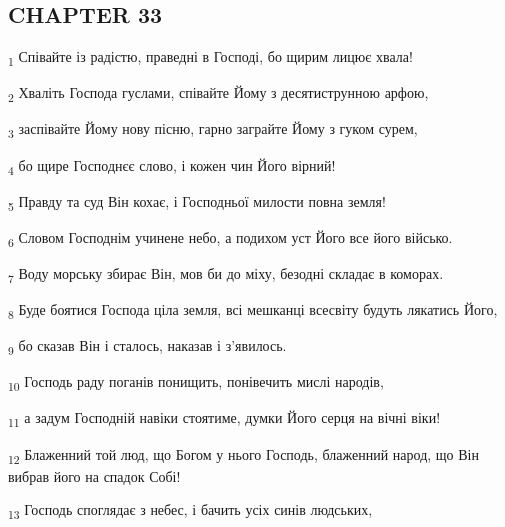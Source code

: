 \subsection{CHAPTER 33}
\begin{tcolorbox}
\textsubscript{1} Співайте із радістю, праведні в Господі, бо щирим лицює хвала!
\end{tcolorbox}
\begin{tcolorbox}
\textsubscript{2} Хваліть Господа гуслами, співайте Йому з десятиструнною арфою,
\end{tcolorbox}
\begin{tcolorbox}
\textsubscript{3} заспівайте Йому нову пісню, гарно заграйте Йому з гуком сурем,
\end{tcolorbox}
\begin{tcolorbox}
\textsubscript{4} бо щире Господнєє слово, і кожен чин Його вірний!
\end{tcolorbox}
\begin{tcolorbox}
\textsubscript{5} Правду та суд Він кохає, і Господньої милости повна земля!
\end{tcolorbox}
\begin{tcolorbox}
\textsubscript{6} Словом Господнім учинене небо, а подихом уст Його все його військо.
\end{tcolorbox}
\begin{tcolorbox}
\textsubscript{7} Воду морську збирає Він, мов би до міху, безодні складає в коморах.
\end{tcolorbox}
\begin{tcolorbox}
\textsubscript{8} Буде боятися Господа ціла земля, всі мешканці всесвіту будуть лякатись Його,
\end{tcolorbox}
\begin{tcolorbox}
\textsubscript{9} бо сказав Він і сталось, наказав і з'явилось.
\end{tcolorbox}
\begin{tcolorbox}
\textsubscript{10} Господь раду поганів понищить, понівечить мислі народів,
\end{tcolorbox}
\begin{tcolorbox}
\textsubscript{11} а задум Господній навіки стоятиме, думки Його серця на вічні віки!
\end{tcolorbox}
\begin{tcolorbox}
\textsubscript{12} Блаженний той люд, що Богом у нього Господь, блаженний народ, що Він вибрав його на спадок Собі!
\end{tcolorbox}
\begin{tcolorbox}
\textsubscript{13} Господь споглядає з небес, і бачить усіх синів людських,
\end{tcolorbox}
